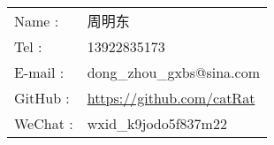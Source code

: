 \begin{tabular}{ll}
  Name : & 周明东 \\
  Tel : & 13922835173 \\
  E-mail : & dong\_zhou\_gxbs@sina.com \\
  GitHub : & \url{https://github.com/catRat} \\
  WeChat : & wxid\_k9jodo5f837m22
\end{tabular}
